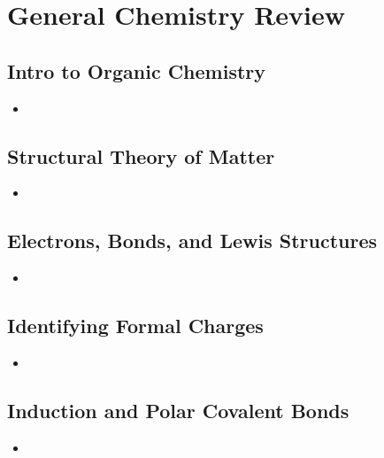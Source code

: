\documentclass[12pt,a4paper]{article}
\begin{document}
\tableofcontents
\cleardoublepage
\fancyhead{}

\clearpage
{}
\clearpage
\section{General Chemistry Review}
\subsection{Intro to Organic Chemistry}
\begin{itemize}
    \item 
\end{itemize}

\subsection{Structural Theory of Matter}
\begin{itemize}
    \item 
\end{itemize}

\subsection{Electrons, Bonds, and Lewis Structures}
\begin{itemize}
    \item 
\end{itemize}

\subsection{Identifying Formal Charges}
\begin{itemize}
    \item 
\end{itemize}

\subsection{Induction and Polar Covalent Bonds}
\begin{itemize}
    \item 
\end{itemize}
\end{document}
